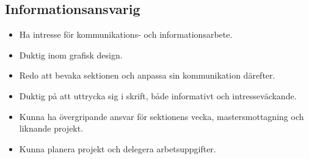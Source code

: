 \documentclass[a4paper]{article}
\begin{document}
\subsection*{Informationsansvarig}
\begin{itemize}
\item Ha intresse för kommunikations- och informationsarbete.
\item Duktig inom grafisk design.
\item Redo att bevaka sektionen och anpassa sin kommunikation därefter.
\item Duktig på att uttrycka sig i skrift, både informativt och intresseväckande.
\item Kunna ha övergripande ansvar för sektionens vecka, mastersmottagning och liknande projekt. 
\item Kunna planera projekt och delegera arbetsuppgifter.
\end{itemize}
                
\end{document}
